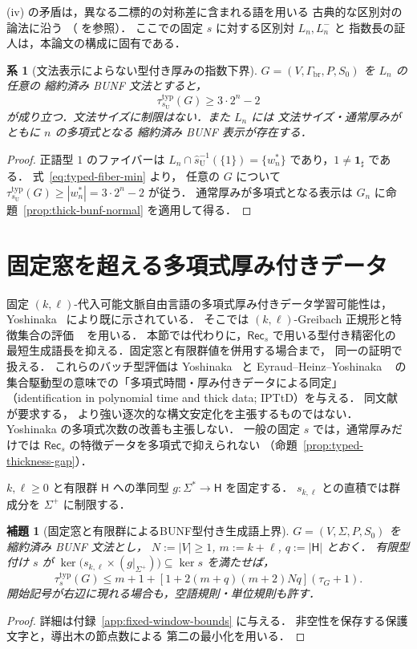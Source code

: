 \documentclass[11pt,a4paper]{ltjsarticle}
\newtheorem{lemma}[theorem]{補題}
\newtheorem{corollary}[theorem]{系}
\theoremstyle{remark}
\theoremstyle{plain}
\begin{document}
(iv) の矛盾は，異なる二標的の対称差に含まれる語を用いる
古典的な区別対の論法に沿う
（\cite[Theorem~15.1.4]{higuera2010} を参照）．
ここでの固定 $s$ に対する区別対 $L_n,L_n^-$ と
指数長の証人は，本論文の構成に固有である．

\begin{corollary}[文法表示によらない型付き厚みの指数下界]
\label{cor:typed-gap-intrinsic}
$G=(V,\Gamma_{\mathrm{br}},P,S_0)$ を $L_n$ の任意の
縮約済み BUNF 文法とすると，
\[
 \boxed{\tau_{s_{\mathrm U}}^{\mathrm{typ}}(G)\ge3\cdot2^n-2}
\]
が成り立つ．文法サイズに制限はない．また $L_n$ には
文法サイズ・通常厚みがともに $n$ の多項式となる
縮約済み BUNF 表示が存在する．
\end{corollary}
\begin{proof}
正語型 $1$ のファイバーは
$L_n\cap\widehat{s}_{\mathrm U}^{-1}(\{1\})=\{w_n^*\}$
であり，$1\ne\mathbf{1}_{\sharp}$ である．
式~\eqref{eq:typed-fiber-min} より，
任意の $G$ について
$\tau_{s_{\mathrm U}}^{\mathrm{typ}}(G)\ge
|w_n^*|=3\cdot2^n-2$ が従う．
通常厚みが多項式となる表示は
$G_n$ に命題~\ref{prop:thick-bunf-normal} を適用して得る．
\end{proof}

\section{固定窓を超える多項式厚み付きデータ}
\label{sec:fixed-window-thick}

固定 $(k,\ell)$-代入可能文脈自由言語の多項式厚み付きデータ学習可能性は，
Yoshinaka~\cite[Theorem~1]{yoshinaka2008} により既に示されている．
そこでは $(k,\ell)$-Greibach 正規形と特徴集合の評価
~\cite[Lemmas~2 and~7]{yoshinaka2008} を用いる．
本節では代わりに，$\mathsf{Rec}_s$ で用いる型付き精密化の
最短生成語長を抑える．固定窓と有限群値を併用する場合まで，
同一の証明で扱える．
これらのバッチ型評価は Yoshinaka~\cite{yoshinaka2008} と
Eyraud--Heinz--Yoshinaka
~\cite[Definition~2.12]{eyraud-heinz-yoshinaka2016} の
集合駆動型の意味での「多項式時間・厚み付きデータによる同定」
（identification in polynomial time and thick data; IPTtD）を与える．
同文献~\cite[Definition~2.5]{eyraud-heinz-yoshinaka2016} が要求する，
より強い逐次的な構文安定化を主張するものではない．
Yoshinaka の多項式次数の改善も主張しない．
一般の固定 $s$ では，通常厚みだけでは
$\mathsf{Rec}_s$ の特徴データを多項式で抑えられない
（命題~\ref{prop:typed-thickness-gap}）．

$k,\ell\ge0$ と有限群 $\mathsf H$ への準同型
$g:\Sigma^*\to\mathsf H$ を固定する．
$s_{k,\ell}$ との直積では群成分を $\Sigma^+$ に制限する．
\begin{lemma}[固定窓と有限群によるBUNF型付き生成語上界]
\label{lem:window-typed-yield}
$G=(V,\Sigma,P,S_0)$ を縮約済み BUNF 文法とし，
$N:=|V|\ge1$, $m:=k+\ell$, $q:=|\mathsf H|$ とおく．
有限型付け $s$ が
$\ker\bigl(s_{k,\ell}\times(g|_{\Sigma^+})\bigr)
\subseteq\ker s$ を満たせば，
\[
 \tau_s^{\mathrm{typ}}(G)
 \le m+1+[1+2(m+q)(m+2)Nq](\tau_G+1).
\]
開始記号が右辺に現れる場合も，空語規則・単位規則も許す．
\end{lemma}
\begin{proof}
詳細は付録~\ref{app:fixed-window-bounds} に与える．
非空性を保存する保護文字と，導出木の節点数による
第二の最小化を用いる．
\end{proof}
\end{document}
